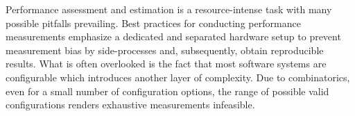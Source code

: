 \documentclass[sigconf]{acmart}
\begin{document}
	Performance assessment and estimation is a resource-intense task with many possible pitfalls prevailing.
	Best practices for conducting performance measurements emphasize a dedicated and separated hardware setup to prevent measurement bias by side-processes and, subsequently, obtain reproducible results.	%
	What is often overlooked is the fact that most software systems are configurable which introduces another layer of complexity.
	Due to combinatorics, even for a small number of configuration options, the range of possible valid configurations renders exhaustive measurements infeasible.

	
\end{document}
